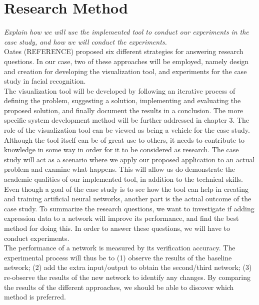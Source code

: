 \section{Research Method}

\textit{Explain how we will use the implemented tool to conduct our experiments in the case study, and how we will conduct the experiments.} \\

\noindent Oates (REFERENCE) proposed six different strategies for answering research questions. In our case, two of these approaches will be employed, namely design and creation for developing the visualization tool, and experiments for the case study in facial recognition. \\

\noindent The visualization tool will be developed by following an iterative process of defining the problem, suggesting a solution, implementing and evaluating the proposed solution, and finally document the results in a conclusion. The more specific system development method will be further addressed in chapter 3. The role of the visualization tool can be viewed as being a vehicle for the case study. Although the tool itself can be of great use to others, it needs to contribute to knowledge in some way in order for it to be considered as research. The case study will act as a scenario where we apply our proposed application to an actual problem and examine what happens. This will allow us do demonstrate the academic qualities of our implemented tool, in addition to the technical skills. \\

\noindent Even though a goal of the case study is to see how the tool can help in creating and training artificial neural networks, another part is the actual outcome of the case study. To summarize the research questions, we want to investigate if adding expression data to a network will improve its performance, and find the best method for doing this. In order to answer these questions, we will have to conduct experiments. \\

\noindent The performance of a network is measured by its verification accuracy. The experimental process will thus be to (1) observe the results of the baseline network; (2) add the extra input/output to obtain the second/third network; (3) re-observe the results of the new network to identify any changes. By comparing the results of the different approaches, we should be able to discover which method is preferred.\\

